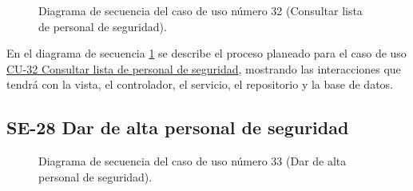 \begin{figure}[htbp!]
	\begin{center}
		\caption{Diagrama de secuencia del caso de uso número 32 (Consultar lista de personal de seguridad).}
		\label{fig:Diagrama de secuencia CU-32}
	\end{center}
\end{figure}

En el diagrama de secuencia \ref{fig:Diagrama de secuencia CU-32} se describe el proceso planeado para el caso de uso \hyperlink{CU-32}{CU-32 Consultar lista de personal de seguridad}, mostrando las interacciones que tendrá con la vista, el controlador, el servicio, el repositorio y la base de datos.

\newpage

\subsection{SE-28 Dar de alta personal de seguridad}

\begin{figure}[htbp!]
	\begin{center}
		\caption{Diagrama de secuencia del caso de uso número 33 (Dar de alta personal de seguridad).}
		\label{fig:Diagrama de secuencia CU-33}
	\end{center}
\end{figure}

